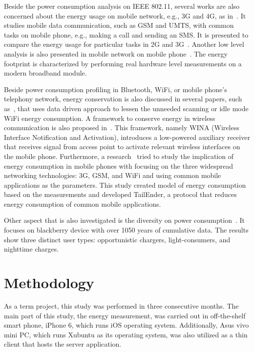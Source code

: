 \documentclass[journal]{vgtc}                %
\begin{document}
Beside the power consumption analysis on IEEE 802.11, several works are also concerned about the energy usage on mobile network, e.g., 3G and 4G, as in~\cite{Perrucci2009}. It studies mobile data communication, such as GSM and UMTS, with common tasks on mobile phone, e.g., making a call and sending an SMS. It is presented to compare the energy usage for particular tasks in 2G and 3G~\cite{Perrucci2009}. Another low level analysis is also presented in mobile network on mobile phone~\cite{Vergara2012}. The energy footprint is characterized by performing real hardware level measurements on a modern broadband module.

Beside power consumption profiling in Bluetooth, WiFi, or mobile phone's telephony network, energy conservation is also discussed in several papers, such as~\cite{Bandara2015}, that uses data driven approach to lessen the unneeded scanning or idle mode WiFi energy consumption. A framework to conserve energy in wireless communication is also proposed in~\cite{Chareen2011}. This framework, namely WINA (Wireless Interface Notification and Activation), introduces a low-powered auxiliary receiver that receives signal from access point to activate relevant wireless interfaces on the mobile phone. Furthermore, a research~\cite{Balasubramanian2009} tried to study the implication of energy consumption in mobile phones with focusing on the three widespread networking technologies: 3G, GSM, and WiFi and using common mobile applications as the parameters. This study created model of energy consumption based on the measurements and developed TailEnder, a protocol that reduces energy consumption of common mobile applications.

Other aspect that is also investigated is the diversity on power consumption~\cite{Oliver2010}. It focuses on blackberry device with over 1050 years of cumulative data. The results show three distinct user types: opportunistic chargers, light-consumers, and nighttime charges.

\section{Methodology} %
\label{sec:methodology}
As a term project, this study was performed in three consecutive months. The main part of this study, the energy measurement, was carried out in off-the-shelf smart phone, iPhone 6, which runs iOS operating system. Additionally, Asus vivo mini PC, which runs Xubuntu as its operating system, was also utilized as a thin client that hosts the server application.
\end{document}
